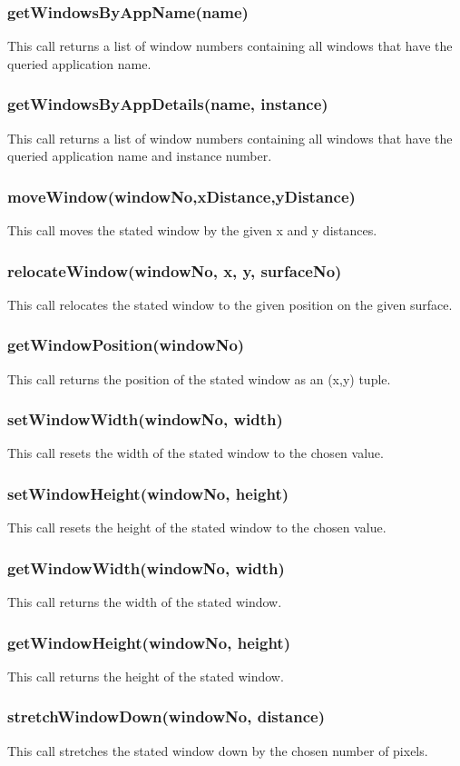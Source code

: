 \documentclass{acm_proc_article-sp}
\begin{document}
\subsubsection{getWindowsByAppName(name)}
This call returns a list of window numbers containing all windows that have the queried application name.
\subsubsection{getWindowsByAppDetails(name, instance)}
This call returns a list of window numbers containing all windows that have the queried application name and instance number.
\subsubsection{moveWindow(windowNo,xDistance,yDistance)}
This call moves the stated window by the given x and y distances.
\subsubsection{relocateWindow(windowNo, x, y, surfaceNo)}
This call relocates the stated window to the given position on the given surface.
\subsubsection{getWindowPosition(windowNo)}
This call returns the position of the stated window as an (x,y) tuple.
\subsubsection{setWindowWidth(windowNo, width)}
This call resets the width of the stated window to the chosen value.
\subsubsection{setWindowHeight(windowNo, height)}
This call resets the height of the stated window to the chosen value.
\subsubsection{getWindowWidth(windowNo, width)}
This call returns the width of the stated window.
\subsubsection{getWindowHeight(windowNo, height)}
This call returns the height of the stated window.
\subsubsection{stretchWindowDown(windowNo, distance)}
This call stretches the stated window down by the chosen number of pixels.
\end{document}
